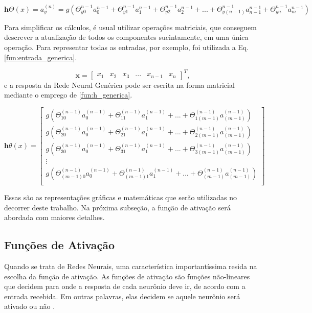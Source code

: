\begin{equation}
    \mathbf{h}{\Theta}(x) = a^{(n)}_y = g(\Theta^{n-1}_{y0}a^{n-1}_{0}+\Theta^{n-1}_{y1}a^{n-1}_{1}+\Theta^{n-1}_{y2}a^{n-1}_{2}+...+\Theta^{n-1}_{y(n-1)}a^{n-1}_{n-1}+\Theta^{n-1}_{yn}a^{n-1}_{m})
     \label{fun:thetanm}
\end{equation}


Para simplificar os cálculos, é usual utilizar operações matriciais, que conseguem descrever a atualização de todos os componentes sucintamente, em uma única operação. Para representar todas as entradas, por exemplo, foi utilizada a Eq. \eqref{fun:entrada_generica}.


\begin{equation}
    \label{fun:entrada_generica}
  \boldsymbol{x} = \begin{bmatrix}x_{1}&x_{2}&x_{3}&...&x_{n-1}&x_{n}\end{bmatrix}^T,
\end{equation}
e a resposta da Rede Neural Genérica pode ser escrita na forma matricial mediante o emprego de \eqref{fun:h_generica}.

 \begin{equation}
   \label{fun:h_generica}
   \mathbf{h}\theta(x) = 
   \begin{bmatrix}
   g(\Theta^{(n-1)}_{10}a^{(n-1)}_{0}+\Theta^{(n-1)}_{11}a^{(n-1)}_{1}+ ... +\Theta^{(n-1)}_{1(m-1)}a^{(n-1)}_{(m-1)} )\\
   g(\Theta^{(n-1)}_{20}a^{(n-1)}_{0}+\Theta^{(n-1)}_{21}a^{(n-1)}_{1}+ ... +\Theta^{(n-1)}_{2(m-1)}a^{(n-1)}_{(m-1)} )\\
   g(\Theta^{(n-1)}_{30}a^{(n-1)}_{0}+\Theta^{(n-1)}_{31}a^{(n-1)}_{1}+ ... +\Theta^{(n-1)}_{3(m-1)}a^{(n-1)}_{(m-1)} )\\
    \vdots\\
    g(\Theta^{(n-1)}_{(m-1)0}a^{(n-1)}_{0}+\Theta^{(n-1)}_{(m-1)1}a^{(n-1)}_{1}+ ... +\Theta^{(n-1)}_{(m-1)}a^{(n-1)}_{(m-1)} )\\
    
   \end{bmatrix} 
\end{equation}


Essas são as representações gráficas e matemáticas que serão utilizadas no decorrer deste trabalho. Na próxima subseção, a função de ativação será abordada com maiores detalhes.

\subsection{Funções de Ativação}
\label{sec:funcaoativacao}
Quando se trata de Redes Neurais, uma característica importantíssima resida na escolha da função de ativação. As funções de ativação são funções não-lineares que decidem para onde a resposta de cada neurônio deve ir, de acordo com a entrada recebida. Em outras palavras, elas decidem se aquele neurônio será ativado ou não \cite{activationfun, haykin2004comprehensive, haykin2009neural, lecun2015deep}.

